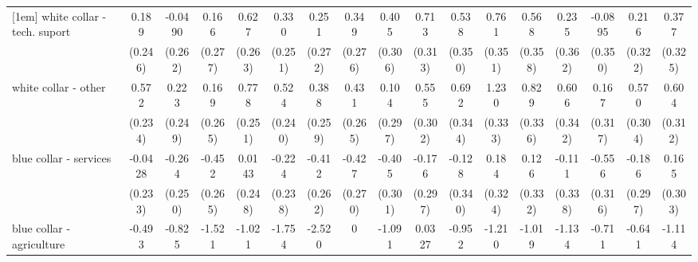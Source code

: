 {\begin{tabular}{l*{16}{c}}
[1em]
white collar - tech. suport&       0.189         &     -0.0490         &       0.166         &       0.627\sym{*}  &       0.330         &       0.251         &       0.349         &       0.405         &       0.713\sym{*}  &       0.538         &       0.761\sym{*}  &       0.568         &       0.235         &     -0.0895         &       0.216         &       0.377         \\
                    &     (0.246)         &     (0.262)         &     (0.277)         &     (0.263)         &     (0.251)         &     (0.272)         &     (0.276)         &     (0.306)         &     (0.313)         &     (0.350)         &     (0.351)         &     (0.358)         &     (0.362)         &     (0.350)         &     (0.322)         &     (0.325)         \\
[1em]
white collar - other&       0.572\sym{*}  &       0.223         &       0.169         &       0.778\sym{**} &       0.524\sym{*}  &       0.388         &       0.431         &       0.104         &       0.555         &       0.692\sym{*}  &       1.230\sym{***}&       0.829\sym{*}  &       0.606         &       0.167         &       0.570         &       0.604         \\
                    &     (0.234)         &     (0.249)         &     (0.265)         &     (0.251)         &     (0.240)         &     (0.259)         &     (0.265)         &     (0.297)         &     (0.302)         &     (0.344)         &     (0.333)         &     (0.336)         &     (0.342)         &     (0.317)         &     (0.304)         &     (0.312)         \\
[1em]
blue collar - services&     -0.0428         &      -0.264         &      -0.452         &      0.0143         &      -0.224         &      -0.412         &      -0.427         &      -0.405         &      -0.176         &      -0.128         &       0.184         &       0.126         &      -0.111         &      -0.556         &      -0.186         &       0.165         \\
                    &     (0.233)         &     (0.250)         &     (0.265)         &     (0.248)         &     (0.238)         &     (0.262)         &     (0.270)         &     (0.301)         &     (0.297)         &     (0.340)         &     (0.324)         &     (0.332)         &     (0.338)         &     (0.316)         &     (0.297)         &     (0.303)         \\
[1em]
blue collar - agriculture&      -0.493         &      -0.825         &      -1.521\sym{*}  &      -1.021         &      -1.754\sym{*}  &      -2.520\sym{*}  &           0         &      -1.091         &      0.0327         &      -0.952         &      -1.210         &      -1.019         &      -1.134         &      -0.711         &      -0.641         &      -1.114         \\

\end{tabular}}
